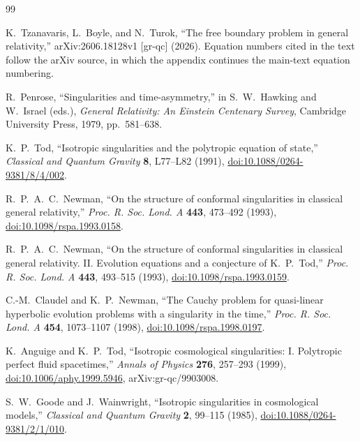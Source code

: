 \documentclass[11pt]{article}
\theoremstyle{canonmath}
\theoremstyle{canonpostulate}
\theoremstyle{canonproposition}
\theoremstyle{canonmath}
\theoremstyle{canonproposition}
\newcommand{\CanonBibliographySetup}{%
  \small
  \setlength{\parskip}{0.22em}
  \setlength{\itemsep}{0.55em}
}
\begin{document}
{}
\begin{thebibliography}{99}
\CanonBibliographySetup

K.~Tzanavaris, L.~Boyle, and N.~Turok, ``The free boundary problem in general relativity,'' arXiv:2606.18128v1 [gr-qc] (2026). Equation numbers cited in the text follow the arXiv source, in which the appendix continues the main-text equation numbering.

R.~Penrose, ``Singularities and time-asymmetry,'' in S.~W.~Hawking and W.~Israel (eds.), \textit{General Relativity: An Einstein Centenary Survey}, Cambridge University Press, 1979, pp.~581--638.

K.~P.~Tod, ``Isotropic singularities and the polytropic equation of state,'' \textit{Classical and Quantum Gravity} \textbf{8}, L77--L82 (1991), \href{https://doi.org/10.1088/0264-9381/8/4/002}{doi:10.1088/0264-9381/8/4/002}.

R.~P.~A.~C.~Newman, ``On the structure of conformal singularities in classical general relativity,'' \textit{Proc. R. Soc. Lond. A} \textbf{443}, 473--492 (1993), \href{https://doi.org/10.1098/rspa.1993.0158}{doi:10.1098/rspa.1993.0158}.

R.~P.~A.~C.~Newman, ``On the structure of conformal singularities in classical general relativity. II. Evolution equations and a conjecture of K.~P.~Tod,'' \textit{Proc. R. Soc. Lond. A} \textbf{443}, 493--515 (1993), \href{https://doi.org/10.1098/rspa.1993.0159}{doi:10.1098/rspa.1993.0159}.

C.-M.~Claudel and K.~P.~Newman, ``The Cauchy problem for quasi-linear hyperbolic evolution problems with a singularity in the time,'' \textit{Proc. R. Soc. Lond. A} \textbf{454}, 1073--1107 (1998), \href{https://doi.org/10.1098/rspa.1998.0197}{doi:10.1098/rspa.1998.0197}.

K.~Anguige and K.~P.~Tod, ``Isotropic cosmological singularities: I. Polytropic perfect fluid spacetimes,'' \textit{Annals of Physics} \textbf{276}, 257--293 (1999), \href{https://doi.org/10.1006/aphy.1999.5946}{doi:10.1006/aphy.1999.5946}, arXiv:gr-qc/9903008.

S.~W.~Goode and J.~Wainwright, ``Isotropic singularities in cosmological models,'' \textit{Classical and Quantum Gravity} \textbf{2}, 99--115 (1985), \href{https://doi.org/10.1088/0264-9381/2/1/010}{doi:10.1088/0264-9381/2/1/010}.


\end{thebibliography}
\end{document}
